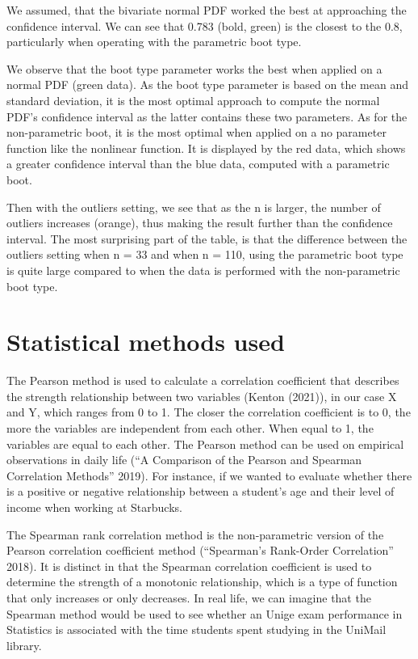 \documentclass[11pt,]{article}
\begin{document}
We assumed, that the bivariate normal PDF worked the best at approaching
the confidence interval. We can see that 0.783 (bold, green) is the
closest to the 0.8, particularly when operating with the parametric boot
type.

We observe that the boot type parameter works the best when applied on a
normal PDF (green data). As the boot type parameter is based on the mean
and standard deviation, it is the most optimal approach to compute the
normal PDF's confidence interval as the latter contains these two
parameters. As for the non-parametric boot, it is the most optimal when
applied on a no parameter function like the nonlinear function. It is
displayed by the red data, which shows a greater confidence interval
than the blue data, computed with a parametric boot.

Then with the outliers setting, we see that as the n is larger, the
number of outliers increases (orange), thus making the result further
than the confidence interval. The most surprising part of the table, is
that the difference between the outliers setting when n = 33 and when n
= 110, using the parametric boot type is quite large compared to when
the data is performed with the non-parametric boot type.

\hypertarget{statistical-methods-used}{%
\section{Statistical methods used}\label{statistical-methods-used}}

The Pearson method is used to calculate a correlation coefficient that
describes the strength relationship between two variables (Kenton
(2021)), in our case X and Y, which ranges from 0 to 1. The closer the
correlation coefficient is to 0, the more the variables are independent
from each other. When equal to 1, the variables are equal to each other.
The Pearson method can be used on empirical observations in daily life
(``A Comparison of the Pearson and Spearman Correlation Methods'' 2019).
For instance, if we wanted to evaluate whether there is a positive or
negative relationship between a student's age and their level of income
when working at Starbucks.

The Spearman rank correlation method is the non-parametric version of
the Pearson correlation coefficient method (``Spearman's Rank-Order
Correlation'' 2018). It is distinct in that the Spearman correlation
coefficient is used to determine the strength of a monotonic
relationship, which is a type of function that only increases or only
decreases. In real life, we can imagine that the Spearman method would
be used to see whether an Unige exam performance in Statistics is
associated with the time students spent studying in the UniMail library.
\end{document}

